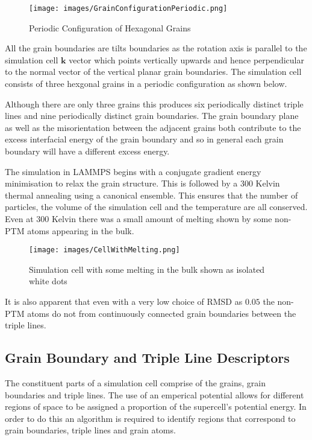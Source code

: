 \documentclass[12pt,a4paper]{book}
\begin{document}
\begin{figure}[H] \label{fig:PerCell}
	\texttt{[image: images/GrainConfigurationPeriodic.png]} 
	\label{fig:GrainCP}
	\caption{Periodic Configuration of Hexagonal Grains}
\end{figure}

All the grain boundaries are tilts boundaries as the rotation axis is parallel to the simulation cell $\mathbf{k}$ vector which points vertically upwards and hence perpendicular to the normal vector of the vertical planar grain boundaries. The simulation cell consists of three hexgonal grains in a periodic configuration as shown below.

Although there are only three grains this produces six periodically distinct triple lines and nine periodically distinct grain boundaries. The grain boundary plane as well as the misorientation between the adjacent grains both contribute to the excess interfacial energy of the grain boundary and so in general each grain boundary will have a different excess energy.

The simulation in LAMMPS begins with a conjugate gradient energy minimisation to relax the grain structure. This is followed by a $300$ Kelvin thermal annealing using a canonical ensemble. This ensures that the number of particles, the volume of the simulation cell and the temperature are all conserved.  Even at $300$ Kelvin there was a small amount of melting shown by some non-PTM atoms appearing in the bulk. 

\begin{figure}
	\centering
	\texttt{[image: images/CellWithMelting.png]} 
	\label{fig:CellMelt}
	\caption{Simulation cell with some melting in the bulk shown
	as isolated white dots}
\end{figure}

It is also apparent that even with a very low choice of RMSD as $0.05$ the non-PTM atoms do not from continuously connected grain boundaries between the triple lines. 


\subsection{Grain Boundary and Triple Line Descriptors}

The constituent parts of a simulation cell comprise of the grains, grain boundaries and triple lines. The use of an emperical potential allows for different regions of space to be assigned a proportion of the supercell's potential energy. In order to do this an algorithm is required to identify regions that correspond to grain boundaries, triple lines and grain atoms.
\end{document}

